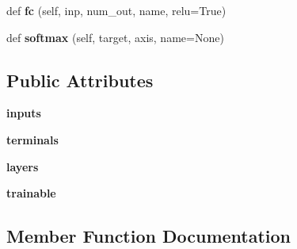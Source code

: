 \begin{DoxyCompactItemize}
\item 
def {\bfseries fc} (self, inp, num\+\_\+out, name, relu=True)\hypertarget{classdetect__face_1_1Network_a5450f5698fd15318d12dbd18b4b9ef72}{}\label{classdetect__face_1_1Network_a5450f5698fd15318d12dbd18b4b9ef72}

\item 
def {\bfseries softmax} (self, target, axis, name=None)\hypertarget{classdetect__face_1_1Network_a7376e5641477584f8819d5d9e5043eb8}{}\label{classdetect__face_1_1Network_a7376e5641477584f8819d5d9e5043eb8}

\end{DoxyCompactItemize}
\subsection*{Public Attributes}
\begin{DoxyCompactItemize}
\item 
{\bfseries inputs}\hypertarget{classdetect__face_1_1Network_a869d691efce01f7d4d70f159a93a1f90}{}\label{classdetect__face_1_1Network_a869d691efce01f7d4d70f159a93a1f90}

\item 
{\bfseries terminals}\hypertarget{classdetect__face_1_1Network_a827c4a5dbba9486bbbe439cf66b200db}{}\label{classdetect__face_1_1Network_a827c4a5dbba9486bbbe439cf66b200db}

\item 
{\bfseries layers}\hypertarget{classdetect__face_1_1Network_ae6cf34012bc82d05b239ead904527aeb}{}\label{classdetect__face_1_1Network_ae6cf34012bc82d05b239ead904527aeb}

\item 
{\bfseries trainable}\hypertarget{classdetect__face_1_1Network_a9f44e04ca2ba3fd708e28c1d1d340350}{}\label{classdetect__face_1_1Network_a9f44e04ca2ba3fd708e28c1d1d340350}

\end{DoxyCompactItemize}


\subsection{Member Function Documentation}
